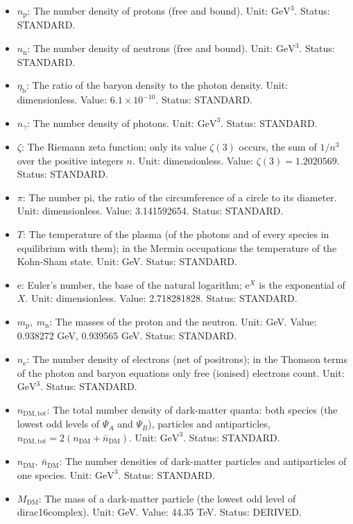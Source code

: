 \documentclass[
  10pt,
]{article}
\providecommand{\tightlist}{%
  \setlength{\itemsep}{0pt}\setlength{\parskip}{0pt}}
\begin{document}
\begin{itemize}
\tightlist
\item
  \(n_{\mathrm{p}}\): The number density of protons (free and bound).
  Unit: \(\mathrm{GeV}^{3}\). Status: STANDARD.
\item
  \(n_{\mathrm{n}}\): The number density of neutrons (free and bound).
  Unit: \(\mathrm{GeV}^{3}\). Status: STANDARD.
\item
  \(\eta_{\mathrm{b}}\): The ratio of the baryon density to the photon
  density. Unit: dimensionless. Value: \(6.1\times10^{-10}\). Status:
  STANDARD.
\item
  \(n_\gamma\): The number density of photons. Unit:
  \(\mathrm{GeV}^{3}\). Status: STANDARD.
\item
  \(\zeta\): The Riemann zeta function; only its value \(\zeta(3)\)
  occurs, the sum of \(1/n^3\) over the positive integers \(n\). Unit:
  dimensionless. Value: \(\zeta(3) = 1.2020569\). Status: STANDARD.
\item
  \(\pi\): The number pi, the ratio of the circumference of a circle to
  its diameter. Unit: dimensionless. Value: 3.141592654. Status:
  STANDARD.
\item
  \(T\): The temperature of the plasma (of the photons and of every
  species in equilibrium with them); in the Mermin occupations the
  temperature of the Kohn-Sham state. Unit: GeV. Status: STANDARD.
\item
  \(\mathrm{e}\): Euler's number, the base of the natural logarithm;
  \(\mathrm{e}^{X}\) is the exponential of \(X\). Unit: dimensionless.
  Value: 2.718281828. Status: STANDARD.
\item
  \(m_{\mathrm{p}},\ m_{\mathrm{n}}\): The masses of the proton and the
  neutron. Unit: GeV. Value: 0.938272 GeV, 0.939565 GeV. Status:
  STANDARD.
\item
  \(n_{\mathrm{e}}\): The number density of electrons (net of
  positrons); in the Thomson terms of the photon and baryon equations
  only free (ionised) electrons count. Unit: \(\mathrm{GeV}^{3}\).
  Status: STANDARD.
\item
  \(n_{\mathrm{DM,tot}}\): The total number density of dark-matter
  quanta: both species (the lowest odd levels of \(\Psi_A\) and
  \(\Psi_B\)), particles and antiparticles,
  \(n_{\mathrm{DM,tot}} = 2(n_{\mathrm{DM}} + \bar n_{\mathrm{DM}})\).
  Unit: \(\mathrm{GeV}^{3}\). Status: STANDARD.
\item
  \(n_{\mathrm{DM}},\ \bar n_{\mathrm{DM}}\): The number densities of
  dark-matter particles and antiparticles of one species. Unit:
  \(\mathrm{GeV}^{3}\). Status: STANDARD.
\item
  \(M_{\mathrm{DM}}\): The mass of a dark-matter particle (the lowest
  odd level of dirac16complex). Unit: GeV. Value: 44.35 TeV. Status:
  DERIVED.
\end{itemize}
\end{document}
